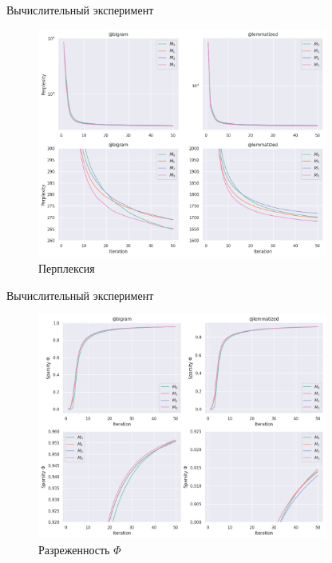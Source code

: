 \documentclass{beamer}
\begin{document}
\begin{frame}{Вычислительный эксперимент}

\begin{figure}
\includegraphics[width=0.85\textwidth]{perplexity_v3}
\caption{Перплексия}
\end{figure}

\end{frame}

\begin{frame}{Вычислительный эксперимент}

\begin{figure}
\includegraphics[width=0.85\textwidth]{sparsity_v3}
\caption{Разреженность $\Phi$}
\end{figure}

\end{frame}
\end{document}
